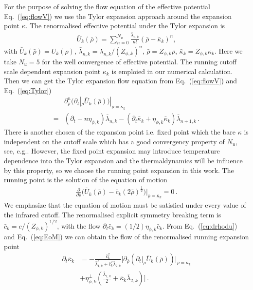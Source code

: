 \documentclass[%
reprint,
superscriptaddress,
showpacs,preprintnumbers,
 amsmath,amssymb,
 aps,
prd,
]{revtex4-1}
\def\Eq#1{Eq.~(\ref{#1})}
\begin{document}
For the purpose of solving the flow equation of the effective potential \Eq{eq:flowV} we use the Tylor expansion approach around the expansion point $\kappa$. The renormalised effective potential under the Tylor expansion is
\begin{align}
\bar{U}_k(\bar{\rho})=\sum^{N_u}_{n=0}\frac{\bar{\lambda}_{n,k}}{n!}(\bar{\rho}-\bar{\kappa}_k)^n,\label{eq:Tylor}
\end{align}
with $\bar{U}_k(\bar{\rho})=U_k(\rho)$, $\bar{\lambda}_{n,k}=\lambda_{n,k}/(Z_{\phi,k})^n$, $\bar{\rho}=Z_{\phi,k}\rho$, $\bar{\kappa}_k=Z_{\phi,k}\kappa_k$.
Here we take $N_u=5$ for the well convergence of effective potential. The running cutoff scale dependent expansion point $\kappa_k$ is emploied in our numerical calculation. Then we can get the Tylor expansion flow equation from \Eq{eq:flowV} and \Eq{eq:Tylor} 
\begin{align}
&\partial^n_{\bar{\rho}}\bigg(\partial_t |_\rho\bar{U}_k(\bar{\rho})\bigg)|_{\bar{\rho}=\bar{\kappa}_k}\nonumber\\[2ex]
=&(\partial_t-n\eta_{\phi,k})\bar{\lambda}_{n,k}-(\partial_t\bar{\kappa}_k+\eta_{\phi,k}\bar{\kappa}_k)\bar{\lambda}_{n+1,k}\,.\label{eq:drhodu}
\end{align}
There is another chosen of the expansion point i.e. fixed point which the bare $\kappa$ is independent on the cutoff scale which has a good convergency property of $N_u$, see, e.g.\cite{Pawlowski:2014zaa,Yin:2019ebz}. However, the fixed point expansion may introduce temperature dependence into the Tylor expansion and the thermaldynamics will be influence by this property, so we choose the running point expansion in this work. The running point is the solution of the equation of motion
\begin{align}
\frac{\partial}{\partial \bar{\rho}}\bigg( \bar{U}_k(\bar{\rho})-\bar{c}_k(2\bar{\rho})^{\frac{1}{2}}\bigg)\big|_{\bar{\rho}=\bar{\kappa}_k}=0\,.\label{eq:EoM}
\end{align}
We emphasize that the equation of motion must be satisfied under every value of the infrared cutoff. The renormalised explicit symmetry breaking term is $\bar{c}_k=c/(Z_{\phi,k})^{1/2}$, with the flow $\partial_t \bar{c}_k=(1/2)\eta_{\phi,k}\bar{c}_k$. From \Eq{eq:drhodu} and \Eq{eq:EoM} we can obtain the flow of the renormalised running expansion point
\begin{align}
  \partial_t \bar \kappa_k&=-\frac{\bar c_k^2}{\bar{\lambda}_{1,k}^3+\bar c_k^2\bar{\lambda}_{2,k}}\bigg[\partial_{\bar \rho}\left(\partial_t\big|_{\rho} \bar U_k(\bar \rho)\right)\Big|_{\bar \rho=\bar \kappa_k}\nonumber \\[2ex]
  &+\eta_{\phi,k}^{\perp}\left(\frac{\bar{\lambda}_{1,k}}{2}+\bar\kappa_k\bar{\lambda}_{2,k}\right)\bigg]\,.\label{}
\end{align}
\end{document}
